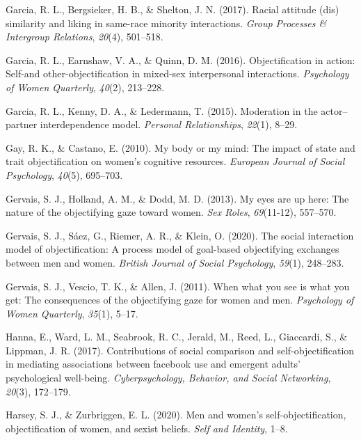 \documentclass[man]{apa6}
\begin{document}
\hypertarget{ref-garcia2017racial}{}
Garcia, R. L., Bergsieker, H. B., \& Shelton, J. N. (2017). Racial
attitude (dis) similarity and liking in same-race minority interactions.
\emph{Group Processes \& Intergroup Relations}, \emph{20}(4), 501--518.

\hypertarget{ref-garcia2016objectification}{}
Garcia, R. L., Earnshaw, V. A., \& Quinn, D. M. (2016). Objectification
in action: Self-and other-objectification in mixed-sex interpersonal
interactions. \emph{Psychology of Women Quarterly}, \emph{40}(2),
213--228.

\hypertarget{ref-garcia2015moderation}{}
Garcia, R. L., Kenny, D. A., \& Ledermann, T. (2015). Moderation in the
actor--partner interdependence model. \emph{Personal Relationships},
\emph{22}(1), 8--29.

\hypertarget{ref-gay2010my}{}
Gay, R. K., \& Castano, E. (2010). My body or my mind: The impact of
state and trait objectification on women's cognitive resources.
\emph{European Journal of Social Psychology}, \emph{40}(5), 695--703.

\hypertarget{ref-gervais2013my}{}
Gervais, S. J., Holland, A. M., \& Dodd, M. D. (2013). My eyes are up
here: The nature of the objectifying gaze toward women. \emph{Sex
Roles}, \emph{69}(11-12), 557--570.

\hypertarget{ref-gervais2020social}{}
Gervais, S. J., Sáez, G., Riemer, A. R., \& Klein, O. (2020). The social
interaction model of objectification: A process model of goal-based
objectifying exchanges between men and women. \emph{British Journal of
Social Psychology}, \emph{59}(1), 248--283.

\hypertarget{ref-gervais2011you}{}
Gervais, S. J., Vescio, T. K., \& Allen, J. (2011). When what you see is
what you get: The consequences of the objectifying gaze for women and
men. \emph{Psychology of Women Quarterly}, \emph{35}(1), 5--17.

\hypertarget{ref-hanna2017contributions}{}
Hanna, E., Ward, L. M., Seabrook, R. C., Jerald, M., Reed, L.,
Giaccardi, S., \& Lippman, J. R. (2017). Contributions of social
comparison and self-objectification in mediating associations between
facebook use and emergent adults' psychological well-being.
\emph{Cyberpsychology, Behavior, and Social Networking}, \emph{20}(3),
172--179.

\hypertarget{ref-harsey2020men}{}
Harsey, S. J., \& Zurbriggen, E. L. (2020). Men and women's
self-objectification, objectification of women, and sexist beliefs.
\emph{Self and Identity}, 1--8.
\end{document}
